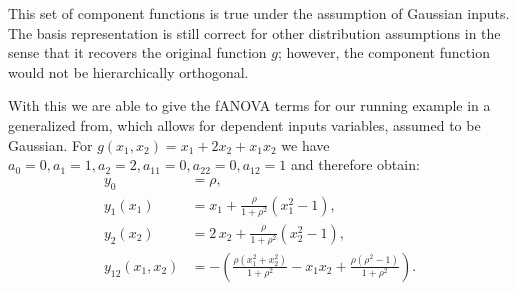 This set of component functions is true under the assumption of Gaussian inputs. The basis representation is still correct for other distribution assumptions in the sense that it recovers the original function $g$; however, the component function would not be hierarchically orthogonal.\par
With this we are able to give the fANOVA terms for our running example in a generalized from, which allows for dependent inputs variables, assumed to be Gaussian. For $g(x_1,x_2) = x_1 + 2x_2 + x_1 x_2$  we have $a_0 = 0, a_1 = 1, a_2 = 2, a_{11} = 0, a_{22} = 0, a_{12} = 1$ and therefore obtain:
\begin{align*}
y_0 &= \rho, \\[3pt]
y_1(x_1) &= x_1 + \frac{\rho}{1+\rho^2}(x_1^2 - 1), \\[3pt]
y_2(x_2) &= 2\,x_2 + \frac{\rho}{1+\rho^2}(x_2^2 - 1), \\[3pt]
y_{12}(x_1,x_2) 
&= -\left(\frac{\rho(x_1^2+x_2^2)}{1+\rho^2} - x_1 x_2 + \frac{\rho(\rho^2-1)}{1+\rho^2}\right).
\end{align*}




